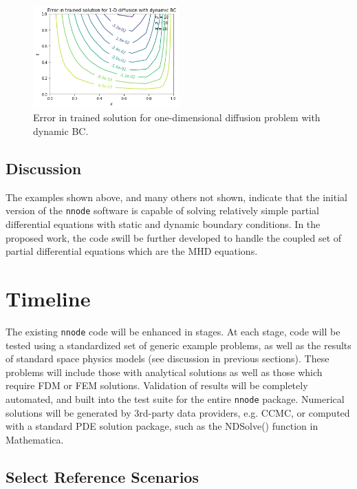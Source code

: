 \documentclass{article}
\begin{document}
\begin{figure}
    \centering
    \includegraphics[width=0.5\textwidth]{figures/diff1d_dynamicBC_error.png}
    \caption{Error in trained solution for one-dimensional diffusion problem with dynamic BC.}
    \label{fig:diff1d_dynamicBC_error}
\end{figure}

\subsection{Discussion}

The examples shown above, and many others not shown, indicate that the initial version of the \texttt{nnode} software is capable of solving relatively simple partial differential equations with static and dynamic boundary conditions. In the proposed work, the code swill be further developed to handle the coupled set of partial differential equations which are the MHD equations.


\newpage

\section{Timeline}

The existing \texttt{nnode} code will be enhanced in stages. At each stage, code will be tested using a standardized set of generic example problems, as well as the results of standard space physics models (see discussion in previous sections). These problems will include those with analytical solutions as well as those which require FDM or FEM solutions. Validation of results will be completely automated, and built into the test suite for the entire \texttt{nnode} package. Numerical solutions will be generated by 3rd-party data providers, e.g. CCMC, or computed with a standard PDE solution package, such as the NDSolve() function in Mathematica.

\subsection{Select Reference Scenarios}
\end{document}

